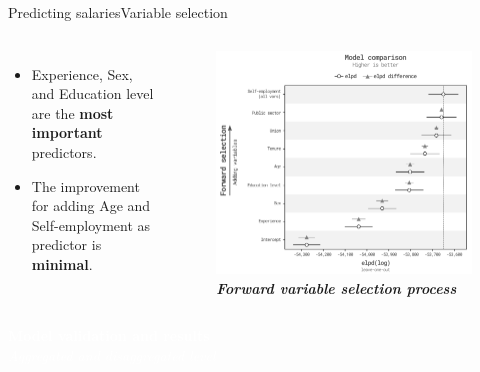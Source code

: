 \documentclass[aspectratio=169, xcolor=dvipsnames]{beamer}
\begin{document}
\begin{frame}{Predicting salaries}{Variable selection}
    \vspace*{-50pt}
    \begin{columns}
            \begin{itemize}
                \item \fontsize{10pt}{12pt}\selectfont Experience, Sex, and Education level are the \textbf{most important} predictors.
                \item \fontsize{10pt}{12pt}\selectfont The improvement for adding Age and Self-employment as predictor is \textbf{minimal}.
            \end{itemize}
            \begin{figure}
                \centering
                \includegraphics[width=1.0\textwidth]{./images/forward_sel.png}
                \captionsetup{labelformat=empty}
                \setlength{\abovecaptionskip}{-10pt}
                \caption{\fontsize{8pt}{8pt}\selectfont \textbf{\textit{Forward variable selection process}}}
            \end{figure}
    \end{columns}
\end{frame}

{
\begin{frame}
    \begin{center}
        \textcolor{white}{{\fontsize{22pt}{14pt}\selectfont \textbf{Model validation and results}}}\\
        \vspace{20pt}
        \textcolor{white}{{\fontsize{14pt}{10pt}\selectfont \textsl{Aggregated and disaggregated level}}}
    \end{center}
\end{frame}
}
\end{document}

